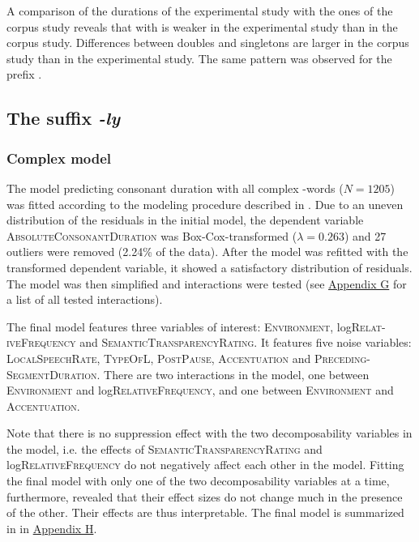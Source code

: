 A comparison of the durations of the experimental study with the ones of the corpus study reveals that  with  is weaker in the experimental study than in the corpus study. Differences between doubles and singletons are larger in the corpus study than in the experimental study. The same pattern was observed for the prefix .


\subsection{The suffix \textit{-ly} }

\subsubsection{Complex model}

The model predicting consonant duration with all complex -words ($N=1205$) was fitted according to the modeling procedure described in . Due to an uneven distribution of the residuals in the initial model, the dependent variable \textsc{AbsoluteConsonantDuration} was Box-Cox-transformed ($\lambda = 0.263$) and 27 outliers were removed (2.24\% of the data). 
After the model was refitted with the transformed dependent variable, it showed a satisfactory distribution of residuals. The model was then simplified and interactions were tested (see \hyperref[Appendix G Summaries of tested interactions in experimental study]{Appendix G} for a list of all tested interactions). 

The final model features three variables of interest: \textsc{Environment}, log\textsc{Relat-iveFrequency} and \textsc{SemanticTransparencyRating}. It features five noise variables: \textsc{LocalSpeechRate}, \textsc{TypeOfL}, \textsc{PostPause}, \textsc{Accentuation} and \textsc{Preceding-SegmentDuration}. 
There are two interactions in the model, one between \textsc{Environment} and log\textsc{RelativeFrequency}, and one between \textsc{Environment} and \textsc{Accentuation}. 

Note that there is no suppression effect with the two decomposability variables in the model, i.e. the effects of  \textsc{SemanticTransparencyRating} and log\textsc{Rela\-tive\-Frequency} do not negatively affect each other in the model. Fitting the final model with only one of the two decomposability variables at a time, furthermore, revealed that their effect sizes do not change much in the presence of the other. Their effects are thus interpretable.
The final model is summarized in  in \hyperref[Appendix H: Model Summaries Experiment]{Appendix H}.

